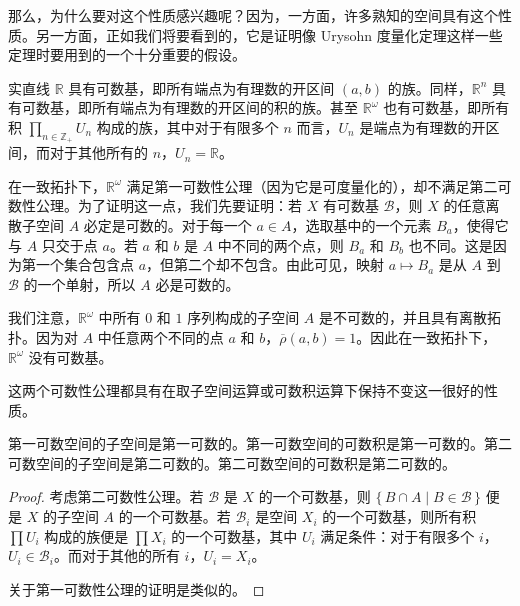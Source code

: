 那么，为什么要对这个性质感兴趣呢？因为，一方面，许多熟知的空间具有这个性质。另一方面，正如我们将要看到的，它是证明像 Urysohn 度量化定理这样一些定理时要用到的一个十分重要的假设。

\begin{example}\label{example:ch04-second-countable-examples}
实直线 $\mathbb{R}$ 具有可数基，即所有端点为有理数的开区间 $(a,b)$ 的族。同样，$\mathbb{R}^{n}$ 具有可数基，即所有端点为有理数的开区间的积的族。甚至 $\mathbb{R}^{\omega}$ 也有可数基，即所有积 $\prod_{n\in\mathbb{Z}_{+}}U_{n}$ 构成的族，其中对于有限多个 $n$ 而言，$U_{n}$ 是端点为有理数的开区间，而对于其他所有的 $n$，$U_{n}=\mathbb{R}$。
\end{example}

\begin{example}\label{example:ch04-uniform-not-second-countable}
在一致拓扑下，$\mathbb{R}^{\omega}$ 满足第一可数性公理（因为它是可度量化的），却不满足第二可数性公理。为了证明这一点，我们先要证明：若 $X$ 有可数基 $\mathcal{B}$，则 $X$ 的任意离散子空间 $A$ 必定是可数的。对于每一个 $a\in A$，选取基中的一个元素 $B_{a}$，使得它与 $A$ 只交于点 $a$。若 $a$ 和 $b$ 是 $A$ 中不同的两个点，则 $B_{a}$ 和 $B_{b}$ 也不同。这是因为第一个集合包含点 $a$，但第二个却不包含。由此可见，映射 $a\mapsto B_{a}$ 是从 $A$ 到 $\mathcal{B}$ 的一个单射，所以 $A$ 必是可数的。

我们注意，$\mathbb{R}^{\omega}$ 中所有 $0$ 和 $1$ 序列构成的子空间 $A$ 是不可数的，并且具有离散拓扑。因为对 $A$ 中任意两个不同的点 $a$ 和 $b$，$\overline{\rho}(a,b)=1$。因此在一致拓扑下，$\mathbb{R}^{\omega}$ 没有可数基。
\end{example}

这两个可数性公理都具有在取子空间运算或可数积运算下保持不变这一很好的性质。

\begin{theorem}\label{theorem:ch04-countability-hereditary}
第一可数空间的子空间是第一可数的。第一可数空间的可数积是第一可数的。第二可数空间的子空间是第二可数的。第二可数空间的可数积是第二可数的。
\end{theorem}

\begin{proof}
考虑第二可数性公理。若 $\mathcal{B}$ 是 $X$ 的一个可数基，则 $\{\,B\cap A\mid B\in\mathcal{B}\,\}$ 便是 $X$ 的子空间 $A$ 的一个可数基。若 $\mathcal{B}_{i}$ 是空间 $X_{i}$ 的一个可数基，则所有积 $\prod U_{i}$ 构成的族便是 $\prod X_{i}$ 的一个可数基，其中 $U_{i}$ 满足条件：对于有限多个 $i$，$U_{i}\in\mathcal{B}_{i}$。而对于其他的所有 $i$，$U_{i}=X_{i}$。

关于第一可数性公理的证明是类似的。
\end{proof}

